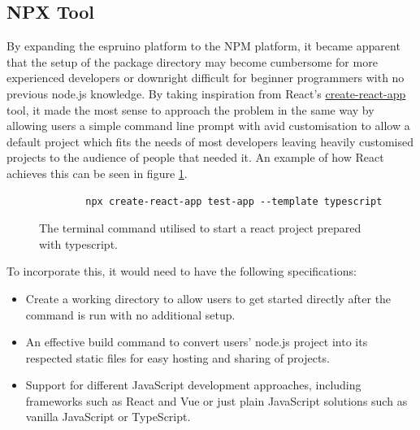 \documentclass{l4proj}
\begin{document}
\subsection{NPX Tool}
\text By expanding the espruino platform to the NPM platform, it became apparent that the setup of the package directory may become cumbersome for more experienced developers or downright difficult for beginner programmers with no previous node.js knowledge. By taking inspiration from React's \href{https://reactjs.org/docs/create-a-new-react-app.html}{create-react-app} tool, it made the most sense to approach the problem in the same way by allowing users a simple command line prompt with avid customisation to allow a default project which fits the needs of most developers leaving heavily customised projects to the audience of people that needed it. An example of how React achieves this can be seen in figure \ref{fig:create-react-app}.
\begin{figure}[H]
    \centering
    \begin{lstlisting}
        npx create-react-app test-app --template typescript
    \end{lstlisting}
    \caption{The terminal command utilised to start a react project prepared with typescript.}
    \label{fig:create-react-app}
\end{figure}
\text To incorporate this, it would need to have the following specifications:
\begin{itemize}
    \item Create a working directory to allow users to get started directly after the command is run with no additional setup.
    \item An effective build command to convert users' node.js project into its respected static files for easy hosting and sharing of projects.
    \item Support for different JavaScript development approaches, including frameworks such as React and Vue or just plain JavaScript solutions such as vanilla JavaScript or TypeScript.
\end{itemize}
\end{document}
